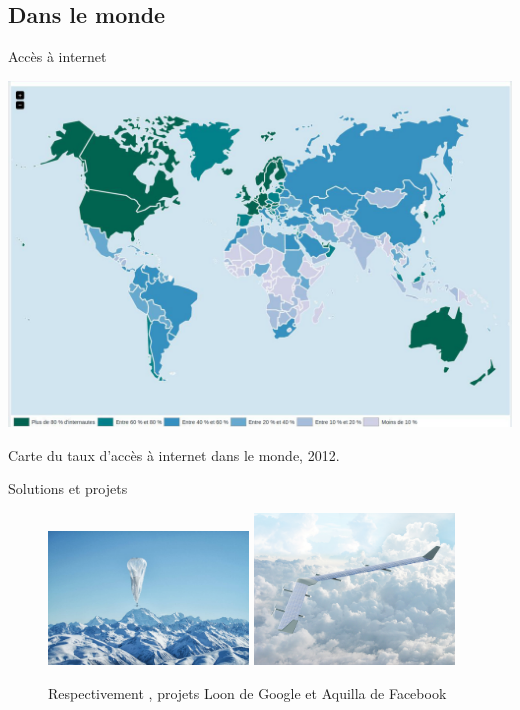 \documentclass{beamer}
\begin{document}
\subsection{Dans le monde}
\begin{frame}{Accès à internet}
    \centerline{\includegraphics[scale=0.475]{acces_internet_mondial.jpg}}
    \centerline{Carte du taux d'accès à internet dans le monde, 2012.}
\end{frame}

\begin{frame}{Solutions et projets}

\begin{figure}
    \includegraphics[width=0.475\textwidth]{loon.jpg}
    \hfill
    \includegraphics[width=0.475\textwidth]{aquilla.jpg}
    \caption{Respectivement , projets Loon de Google et Aquilla de Facebook}
\end{figure}


  
        
   
            
  
            
        
  
\end{frame}
\end{document}
